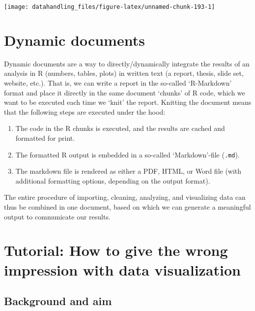 \documentclass[
  12pt,
]{style/krantz}
\providecommand{\tightlist}{%
  \setlength{\itemsep}{0pt}\setlength{\parskip}{0pt}}
\begin{document}
\texttt{[image: datahandling\_files/figure-latex/unnamed-chunk-193-1]}

\hypertarget{dynamic-documents}{%
\section{Dynamic documents}\label{dynamic-documents}}

Dynamic documents are a way to directly/dynamically integrate the results of an analysis in R (numbers, tables, plots) in written text (a report, thesis, slide set, website, etc.). That is, we can write a report in the so-called `R-Markdown' format and place it directly in the same document `chunks' of R code, which we want to be executed each time we `knit' the report. Knitting the document means that the following steps are executed under the hood:

\begin{enumerate}
\def\labelenumi{\arabic{enumi}.}
\tightlist
\item
  The code in the R chunks is executed, and the results are cached and formatted for print.
\item
  The formatted R output is embedded in a so-called `Markdown'-file (\texttt{.md}).
\item
  The markdown file is rendered as either a PDF, HTML, or Word file (with additional formatting options, depending on the output format).
\end{enumerate}

The entire procedure of importing, cleaning, analyzing, and visualizing data can thus be combined in one document, based on which we can generate a meaningful output to communicate our results.

\hypertarget{tutorial-how-to-give-the-wrong-impression-with-data-visualization}{%
\section{Tutorial: How to give the wrong impression with data visualization}\label{tutorial-how-to-give-the-wrong-impression-with-data-visualization}}

\hypertarget{background-and-aim}{%
\subsection{Background and aim}\label{background-and-aim}}
\end{document}

